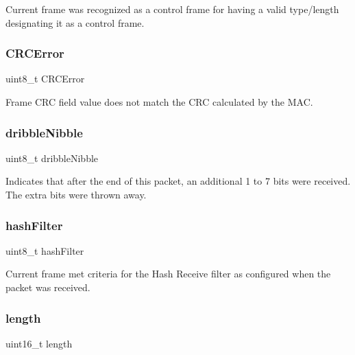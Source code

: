 Current frame was recognized as a control frame for having a valid type/length designating it as a control frame. 

\mbox{\label{struct_r_s_v___a331925f67a8efb3a251601448de7b1eb}} 
\subsubsection{\texorpdfstring{CRCError}{CRCError}}
{\footnotesize\ttfamily uint8\+\_\+t C\+R\+C\+Error}



Frame C\+RC field value does not match the C\+RC calculated by the M\+AC. 

\mbox{\label{struct_r_s_v___a907e981c9915dc72df656689b5ff1f62}} 
\subsubsection{\texorpdfstring{dribbleNibble}{dribbleNibble}}
{\footnotesize\ttfamily uint8\+\_\+t dribble\+Nibble}



Indicates that after the end of this packet, an additional 1 to 7 bits were received. The extra bits were thrown away. 

\mbox{\label{struct_r_s_v___a4ebbb06c87ec613dd00b55ed91c67535}} 
\subsubsection{\texorpdfstring{hashFilter}{hashFilter}}
{\footnotesize\ttfamily uint8\+\_\+t hash\+Filter}



Current frame met criteria for the Hash Receive filter as configured when the packet was received. 

\mbox{\label{struct_r_s_v___a1892eba2086d12ac2b09005aeb09ea3b}} 
\subsubsection{\texorpdfstring{length}{length}}
{\footnotesize\ttfamily uint16\+\_\+t length}

